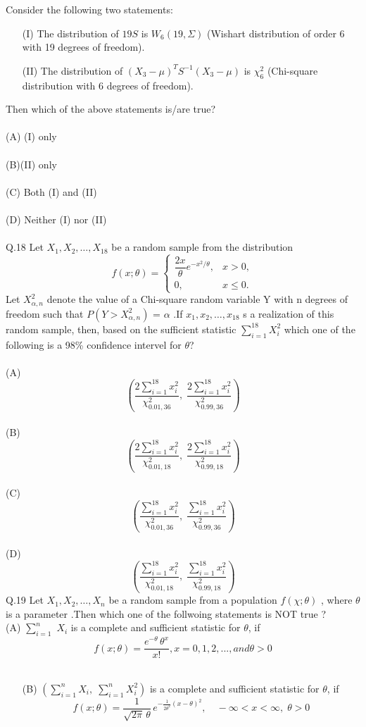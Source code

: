 \documentclass{book}[200pt]
\begin{document}
{$$$$ 
Consider the following two statements:
\begin{enumerate}
	\item[(I)] The distribution of $19S$ is $W_6(19,\Sigma)$ 
	(Wishart distribution of order 6 with 19 degrees of freedom).
	\item[(II)] The distribution of $(X_3 - \mu)^T S^{-1}(X_3 - \mu)$ 
	is $\chi^2_6$ (Chi-square distribution with 6 degrees of freedom).
\end{enumerate}
Then which of the above statements is/are true?\\
\\
(A) (I) only\\
\\
(B)(II) only\\
\\
(C) Both (I) and (II)\\
\\
(D) Neither (I) nor (II)\\
\\
Q.18 Let $X_1,X_2, \dots,X_{18}$ be a random sample from the distribution\\
 \[
 f(x; \theta) =
 \begin{cases}
 	\dfrac{2x}{\theta} e^{-x^2/\theta}, & x > 0, \\[4pt]
 	0, & x \leq 0.
 \end{cases}
 \]
 Let $X^2_{\alpha,n}$ denote the value of a Chi-square random variable Y with n degrees of
 freedom such that $P(Y > X^2_{\alpha, n})$ = $\alpha$ .If $x_1,x_2, \dots,x_{18}$ s a realization of this random sample, then, based on the sufficient statistic $\sum_{i = 1}^{18} X^2_i$ which one of the following
 is a 98\% confidence intervel for $\theta$?
 \\
 \\
(A) 
\[
\left( 
\dfrac{2 \sum_{i=1}^{18} x_i^2}{\chi^2_{0.01,36}},\;
\dfrac{2 \sum_{i=1}^{18} x_i^2}{\chi^2_{0.99,36}} 
\right)
\]
\\
(B)
\[
\left( 
\dfrac{2 \sum_{i=1}^{18} x_i^2}{\chi^2_{0.01,18}},\;
\dfrac{2 \sum_{i=1}^{18} x_i^2}{\chi^2_{0.99,18}} 
\right)
\]
\\
(C) 
\[
\left( 
\dfrac{ \sum_{i=1}^{18} x_i^2}{\chi^2_{0.01,36}},\;
\dfrac{ \sum_{i=1}^{18} x_i^2}{\chi^2_{0.99,36}} 
\right)
\]\\
(D)\[
\left( 
\dfrac{\sum_{i=1}^{18} x_i^2}{\chi^2_{0.01,18}},\;
\dfrac{\sum_{i=1}^{18} x_i^2}{\chi^2_{0.99,18}} 
\right)
\]
Q.19 Let $X_1,X_2, \dots ,X_n$ be a random sample from a population $f(\chi; \theta)$ , where $\theta$ is a parameter .Then which one of the follwoing statements is NOT true ?\\
(A) $\sum_{i=1}^{n}$ $X_i$ is a complete and sufficient  statistic for $\theta$, if \[
f(x; \theta) = 
\dfrac{e^{-\theta}\,\theta^{x}}{x!} , x = 0,1,2, ..., and \theta > 0
\]\\
\begin{enumerate}
	\item[(B)] 
	$(\sum_{i=1}^n X_i,\; \sum_{i=1}^n X_i^2)$ is a complete and sufficient statistic for $\theta$, if 
	\[
	f(x; \theta) = \frac{1}{\sqrt{2 \pi}\,\theta}\,
	e^{-\frac{1}{2\theta^2}(x-\theta)^2},
	\quad -\infty < x < \infty,\; \theta > 0
	\]
	

\end{enumerate}}
\end{document}
